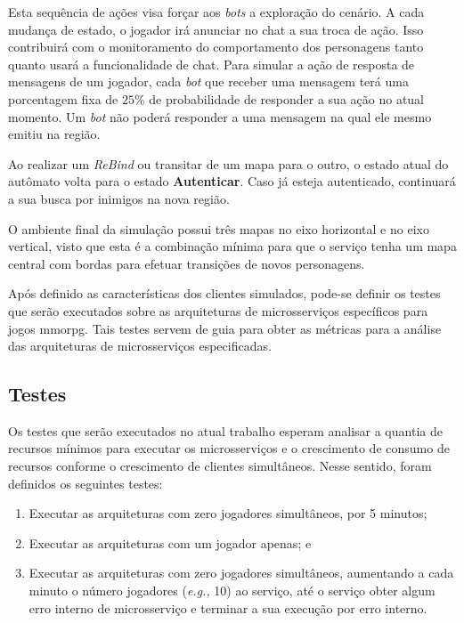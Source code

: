 Esta sequência de ações visa forçar aos \textit{bots} a exploração do cenário.
%
A cada mudança de estado, o jogador irá anunciar no chat a sua troca de ação.
%
Isso contribuirá com o monitoramento do comportamento dos personagens tanto quanto usará a funcionalidade de chat.
%
Para simular a ação de resposta de mensagens de um jogador, cada \textit{bot} que receber uma mensagem terá uma porcentagem fixa de $25\%$ de probabilidade de responder a sua ação no atual momento.
%
Um \textit{bot} não poderá responder a uma mensagem na qual ele mesmo emitiu na região.


Ao realizar um \textit{ReBind} ou transitar de um mapa para o outro, o estado atual do autômato volta para o estado \textbf{Autenticar}.
%
Caso já esteja autenticado, continuará a sua busca por inimigos na nova região.

O ambiente final da simulação possui três mapas no eixo horizontal e no eixo vertical, visto que esta é a combinação mínima para que o serviço tenha um mapa central com bordas para efetuar transições de novos personagens.

Após definido as características dos clientes simulados, pode-se definir os testes que serão executados sobre as arquiteturas de microsserviços específicos para jogos \ac{mmorpg}.
%
Tais testes servem de guia para obter as métricas para a análise das arquiteturas de microsserviços especificadas.

\subsection{Testes}

Os testes que serão executados no atual trabalho esperam analisar a quantia de recursos mínimos para executar os microsserviços e o crescimento de consumo de recursos conforme o crescimento de clientes simultâneos.
%
Nesse sentido, foram definidos os seguintes testes:

\begin{enumerate}
  \item Executar as arquiteturas com zero jogadores simultâneos, por 5 minutos;
  \item Executar as arquiteturas com um jogador apenas; e
  \item Executar as arquiteturas com zero jogadores simultâneos, aumentando a cada minuto o número jogadores (\textit{e.g.,} 10) ao serviço, até o serviço obter algum erro interno de microsserviço e terminar a sua execução por erro interno.
\end{enumerate}

